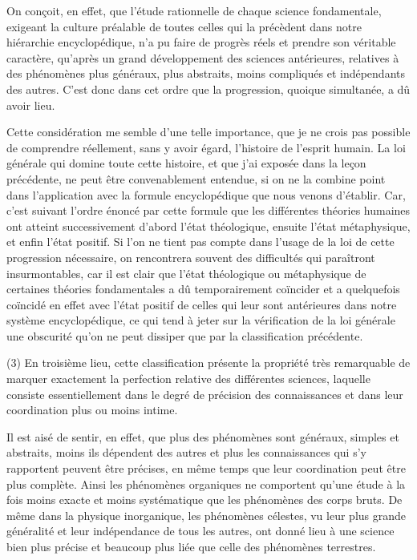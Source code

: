 \documentclass[french,twoside]{book} %
\begin{document}
On conçoit, en effet, que l’étude rationnelle de chaque science fondamentale, exigeant la culture préalable de toutes celles qui la précèdent dans notre hiérarchie encyclopédique, n’a pu faire de progrès réels et prendre son véritable caractère, qu’après un grand développement des sciences antérieures, relatives à des phénomènes plus généraux, plus abstraits, moins compliqués et indépendants des autres. C’est donc dans cet ordre que la progression, quoique simultanée, a dû avoir lieu.\par
Cette considération me semble d’une telle importance, que je ne crois pas possible de comprendre réellement, sans y avoir égard, l’histoire de l’esprit humain. La loi générale qui domine toute cette histoire, et que j’ai exposée dans la leçon précédente, ne peut être convenablement entendue, si on ne la combine point dans l’application avec la formule encyclopédique que nous venons d’établir. Car, c’est suivant l’ordre énoncé par cette formule que les différentes théories humaines ont atteint successivement d’abord l’état théologique, ensuite l’état métaphysique, et enfin l’état positif. Si l’on ne tient pas compte dans l’usage de la loi de cette progression nécessaire, on rencontrera souvent des difficultés qui paraîtront insurmontables, car il est clair que l’état théologique ou métaphysique de certaines théories fondamentales a dû temporairement coïncider et a quelquefois coïncidé en effet avec l’état positif de celles qui leur sont antérieures dans notre système encyclopédique, ce qui tend à jeter sur la vérification de la loi générale une obscurité qu’on ne peut dissiper que par la classification précédente.\par
(3) En troisième lieu, cette classification présente la propriété très remarquable de marquer exactement la perfection relative des différentes sciences, laquelle consiste essentiellement dans le degré de précision des connaissances et dans leur coordination plus ou moins intime.\par
Il est aisé de sentir, en effet, que plus des phénomènes sont généraux, simples et abstraits, moins ils dépendent des autres et plus les connaissances qui s’y rapportent peuvent être précises, en même temps que leur coordination peut être plus complète. Ainsi les phénomènes organiques ne comportent qu’une étude à la fois moins exacte et moins systématique que les phénomènes des corps bruts. De même dans la physique inorganique, les phénomènes célestes, vu leur plus grande généralité et leur indépendance de tous les autres, ont donné lieu à une science bien plus précise et beaucoup plus liée que celle des phénomènes terrestres.\par
\end{document}

